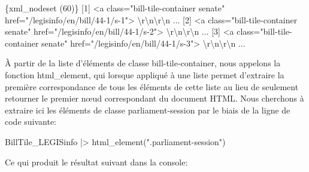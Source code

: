 \documentclass[
  letterpaper,
  DIV=11,
  numbers=noendperiod]{scrreprt}
\newenvironment{Shaded}{\begin{snugshade}}{\end{snugshade}}
\newcommand{\ErrorTok}[1]{\textcolor[rgb]{0.68,0.00,0.00}{#1}}
\newcommand{\ExtensionTok}[1]{\textcolor[rgb]{0.00,0.23,0.31}{#1}}
\newcommand{\KeywordTok}[1]{\textcolor[rgb]{0.00,0.23,0.31}{#1}}
\newcommand{\NormalTok}[1]{\textcolor[rgb]{0.00,0.23,0.31}{#1}}
\newcommand{\OperatorTok}[1]{\textcolor[rgb]{0.37,0.37,0.37}{#1}}
\newcommand{\StringTok}[1]{\textcolor[rgb]{0.13,0.47,0.30}{#1}}
\begin{document}
\begin{Shaded}
\begin{Highlighting}[]
\ExtensionTok{\{xml\_nodeset} \ErrorTok{(}\ExtensionTok{60}\KeywordTok{)}\ErrorTok{\}}
 \ExtensionTok{[1]} \OperatorTok{\textless{}}\NormalTok{a class=}\StringTok{"bill{-}tile{-}container senate"}\NormalTok{ href=}\StringTok{"/legisinfo/en/bill/44{-}1/s{-}1"}\OperatorTok{\textgreater{}}
 \ExtensionTok{\textbackslash{}r\textbackslash{}n\textbackslash{}r\textbackslash{}n}\NormalTok{     ...}
 \ExtensionTok{[2]} \OperatorTok{\textless{}}\NormalTok{a class=}\StringTok{"bill{-}tile{-}container senate"}\NormalTok{ href=}\StringTok{"/legisinfo/en/bill/44{-}1/s{-}2"}\OperatorTok{\textgreater{}}
 \ExtensionTok{\textbackslash{}r\textbackslash{}n\textbackslash{}r\textbackslash{}n}\NormalTok{     ...}
 \ExtensionTok{[3]} \OperatorTok{\textless{}}\NormalTok{a class=}\StringTok{"bill{-}tile{-}container senate"}\NormalTok{ href=}\StringTok{"/legisinfo/en/bill/44{-}1/s{-}3"}\OperatorTok{\textgreater{}}
 \ExtensionTok{\textbackslash{}r\textbackslash{}n\textbackslash{}r\textbackslash{}n}\NormalTok{     ...}
\end{Highlighting}
\end{Shaded}

À partir de la liste d'éléments de classe bill-tile-container, nous
appelons la fonction html\_element, qui lorsque appliqué à une liste
permet d'extraire la première correspondance de tous les éléments de
cette liste au lieu de seulement retourner le premier nœud correspondant
du document HTML. Nous cherchons à extraire ici les éléments de classe
parliament-session par le biais de la ligne de code suivante:

\begin{Shaded}
\begin{Highlighting}[]
\ExtensionTok{BillTile\_LEGISinfo} \KeywordTok{|}\OperatorTok{\textgreater{}}\NormalTok{ html\_element}\KeywordTok{(}\StringTok{".parliament{-}session"}\KeywordTok{)} 
\end{Highlighting}
\end{Shaded}

Ce qui produit le résultat suivant dans la console:
\end{document}
